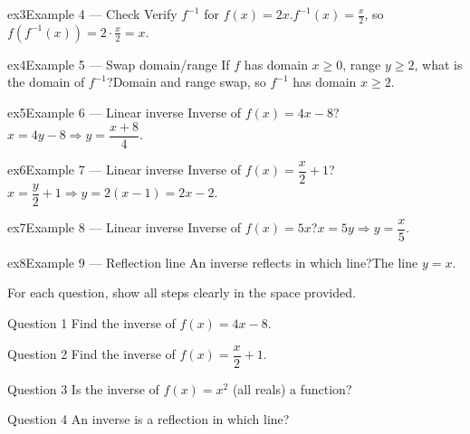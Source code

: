 \documentclass[11pt]{article}
\begin{document}
\begin{example}{ex3}{Example 4 --- Check}
Verify $f^{-1}$ for $f(x)=2x$.\soln $f^{-1}(x)=\tfrac{x}{2}$, so $f(f^{-1}(x))=2\cdot\tfrac{x}{2}=x$. \checkmark
\end{example}

\begin{example}{ex4}{Example 5 --- Swap domain/range}
If $f$ has domain $x\ge0$, range $y\ge2$, what is the domain of $f^{-1}$?\soln Domain and range swap, so $f^{-1}$ has domain $x\ge2$.
\end{example}

\begin{example}{ex5}{Example 6 --- Linear inverse}
Inverse of $f(x)=4x-8$?\soln $x=4y-8\Rightarrow y=\dfrac{x+8}{4}$.
\end{example}

\begin{example}{ex6}{Example 7 --- Linear inverse}
Inverse of $f(x)=\dfrac{x}{2}+1$?\soln $x=\dfrac{y}{2}+1\Rightarrow y=2(x-1)=2x-2$.
\end{example}

\begin{example}{ex7}{Example 8 --- Linear inverse}
Inverse of $f(x)=5x$?\soln $x=5y\Rightarrow y=\dfrac{x}{5}$.
\end{example}

\begin{example}{ex8}{Example 9 --- Reflection line}
An inverse reflects in which line?\soln The line $y=x$.
\end{example}

\clearpage
{}
For each question, show all steps clearly in the space provided.

\begin{qbox}{Question 1}
Find the inverse of $f(x)=4x-8$.\workspace{2.4cm}
\end{qbox}

\begin{qbox}{Question 2}
Find the inverse of $f(x)=\dfrac{x}{2}+1$.\workspace{2.4cm}
\end{qbox}

\begin{qbox}{Question 3}
Is the inverse of $f(x)=x^2$ (all reals) a function?\workspace{2.4cm}
\end{qbox}

\begin{qbox}{Question 4}
An inverse is a reflection in which line?\workspace{2.4cm}
\end{qbox}
\end{document}
